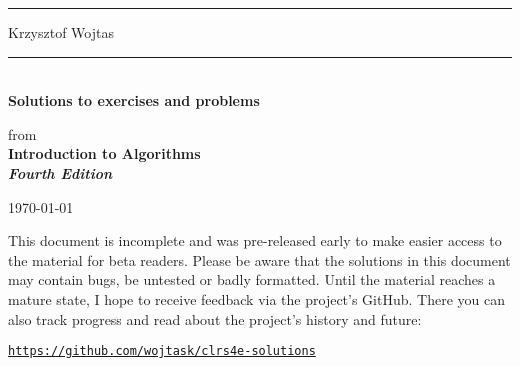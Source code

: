 \thispagestyle{empty}
\noindent\hspace*{-\lmarginparwidth}\rule{\lmarginparwidth+\textwidth}{\thickrulethickness}
\noindent\hspace*{-\lmarginparwidth}Krzysztof Wojtas
\vspace*{1.7in}
\par\noindent\rule{\textwidth}{\thinrulethickness}\\[5pt]
{\Large\textbf{Solutions to exercises and problems}}
\vspace*{.5in}
\begin{center}
    from\\[1ex]
    \Large\textbf{Introduction to Algorithms\\
    \textit{Fourth Edition}}
\end{center}
\vspace*{.5in}
\par{}

\vfill

\hfill{\footnotesize\today}

\pagebreak

\hbox{}\vfill
{}
\vspace*{.2in}
\par\noindent This document is incomplete and was pre-released early to make easier access to the material for beta readers.
Please be aware that the solutions in this document may contain bugs, be untested or badly formatted.
Until the material reaches a mature state, I hope to receive feedback via the project's GitHub.
There you can also track progress and read about the project's history and future:
\begin{center}
    \href{https://github.com/wojtask/clrs4e-solutions}{\texttt{https://github.com/wojtask/clrs4e-solutions}}
\end{center}
\vfill

\pagebreak
